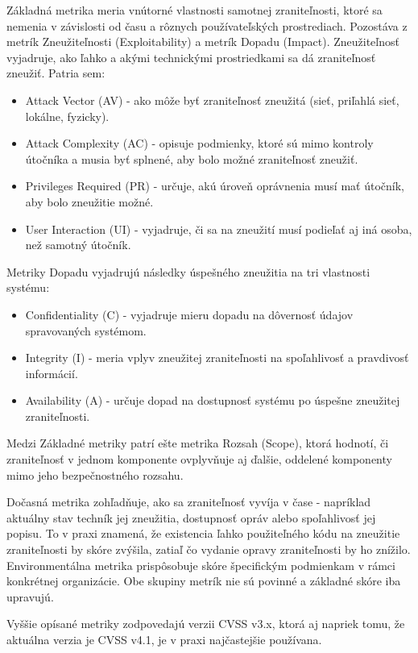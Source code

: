 Základná metrika meria vnútorné vlastnosti samotnej zraniteľnosti, ktoré sa nemenia v závislosti od času a rôznych používateľských prostrediach.
Pozostáva z metrík Zneužiteľnosti (Exploitability) a metrík Dopadu (Impact).
Zneužiteľnosť vyjadruje, ako ľahko a akými technickými prostriedkami sa dá zraniteľnosť zneužiť. Patria sem:
\begin{itemize}
    \item Attack Vector (AV) - ako môže byť zraniteľnosť zneužitá (sieť, priľahlá sieť, lokálne, fyzicky).
    \item Attack Complexity (AC) - opisuje podmienky, ktoré sú mimo kontroly útočníka a musia byť splnené, aby bolo možné zraniteľnosť zneužiť.
    \item Privileges Required (PR) - určuje, akú úroveň oprávnenia musí mať útočník, aby bolo zneužitie možné.
    \item User Interaction (UI) - vyjadruje, či sa na zneužití musí podieľať aj iná osoba, než samotný útočník.
\end{itemize}

Metriky Dopadu vyjadrujú následky úspešného zneužitia na tri vlastnosti systému:
\begin{itemize}
    \item Confidentiality (C) - vyjadruje mieru dopadu na dôvernosť údajov spravovaných systémom.
    \item Integrity (I) - meria vplyv zneužitej zraniteľnosti na spoľahlivosť a pravdivosť informácií.
    \item Availability (A) - určuje dopad na dostupnosť systému po úspešne zneužitej zraniteľnosti.
\end{itemize}

Medzi Základné metriky patrí ešte metrika Rozsah (Scope), ktorá hodnotí, či zraniteľnosť v jednom komponente
ovplyvňuje aj ďalšie, oddelené komponenty mimo jeho bezpečnostného rozsahu.

Dočasná metrika zohľadňuje, ako sa zraniteľnosť vyvíja v čase - napríklad aktuálny stav techník jej zneužitia, 
dostupnosť opráv alebo spoľahlivosť jej popisu. 
To v praxi znamená, že existencia ľahko použiteľného kódu na zneužitie zraniteľnosti by skóre zvýšila, 
zatiaľ čo vydanie opravy zraniteľnosti by ho znížilo.
Environmentálna metrika prispôsobuje skóre špecifickým podmienkam v rámci konkrétnej organizácie.
Obe skupiny metrík nie sú povinné a základné skóre iba upravujú.

Vyššie opísané metriky zodpovedajú verzii CVSS v3.x, ktorá aj napriek tomu, že aktuálna verzia je CVSS v4.1, je v praxi najčastejšie používana.

